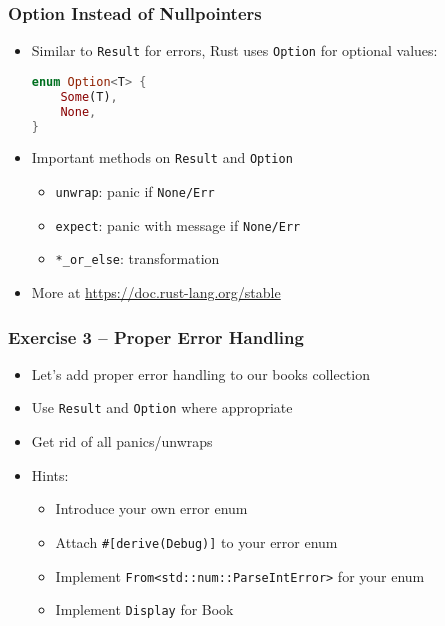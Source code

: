 \begin{frame}[fragile]
    \frametitle{Option Instead of Nullpointers}

    \begin{itemize}
        \item Similar to \texttt{Result} for errors, Rust uses \texttt{Option} for optional values:
        \begin{lstlisting}[language=rust]
enum Option<T> {
    Some(T),
    None,
}
        \end{lstlisting}

    \pause

        \item Important methods on \texttt{Result} and \texttt{Option}
        \begin{itemize}
            \item \texttt{unwrap}: panic if \texttt{None/Err}
            \item \texttt{expect}: panic with message if \texttt{None/Err}
            \item \texttt{*\_or\_else}: transformation
        \end{itemize}

    \pause

        \item More at \url{https://doc.rust-lang.org/stable}
    \end{itemize}
\end{frame}

\begin{frame}[fragile]
    \frametitle{Exercise 3 -- Proper Error Handling}

    \begin{itemize}
        \item Let's add proper error handling to our books collection
        \item Use \texttt{Result} and \texttt{Option} where appropriate
        \item Get rid of all panics/unwraps
        \item Hints:
        \begin{itemize}
            \item Introduce your own error enum
            \item Attach \texttt{\#[derive(Debug)]} to your error enum
            \item Implement \texttt{From<std::num::ParseIntError>} for your enum
            \item Implement \texttt{Display} for Book
        \end{itemize}
    \end{itemize}
\end{frame}
